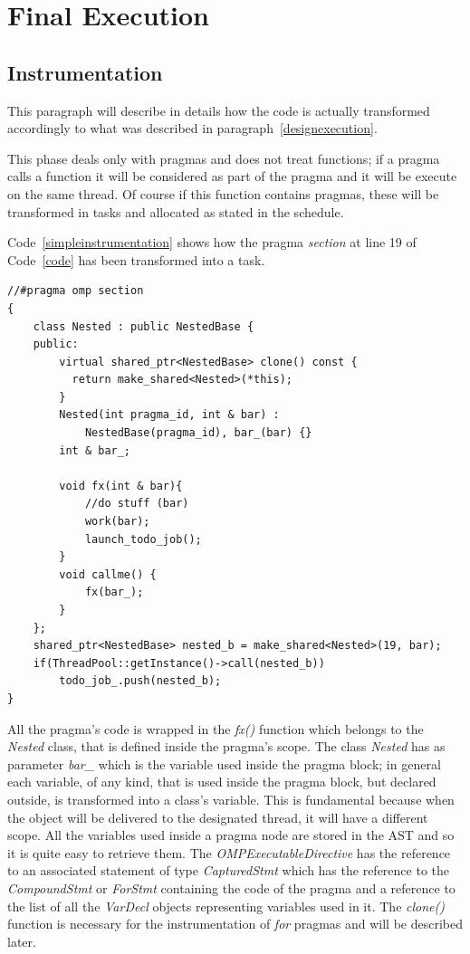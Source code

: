 \documentclass[a4paper,11pt,oneside]{book}
\begin{document}
\section{Final Execution}
\subsection{Instrumentation}
This paragraph will describe in details how the code is actually transformed accordingly to what was described in paragraph~\ref{designexecution}.

This phase deals only with pragmas and does not treat functions; if a pragma calls a function it will be considered as part of the pragma and it will be execute on the same thread. Of course if this function contains pragmas, these will be transformed in tasks and allocated as stated in the schedule.

Code~\ref{simpleinstrumentation} shows how the pragma \emph{section} at line 19 of Code~\ref{code} has been transformed into a task.

\begin{lstlisting}[language=CCC, caption=Example of an instrumented \emph{section} pragma from Code~\ref{code}., label=simpleinstrumentation]
 //#pragma omp section
{
    class Nested : public NestedBase {
    public: 
        virtual shared_ptr<NestedBase> clone() const { 
          return make_shared<Nested>(*this); 
        } 
        Nested(int pragma_id, int & bar) : 
            NestedBase(pragma_id), bar_(bar) {}
        int & bar_;
            
        void fx(int & bar){   
            //do stuff (bar)
            work(bar);
            launch_todo_job(); 
        }
        void callme() {
            fx(bar_);
        }
    };
    shared_ptr<NestedBase> nested_b = make_shared<Nested>(19, bar);                             
    if(ThreadPool::getInstance()->call(nested_b)) 
        todo_job_.push(nested_b); 
}
\end{lstlisting}

All the pragma’s code is wrapped in the \emph{fx()} function which belongs to the \emph{Nested} class, that is defined inside the pragma’s scope. The class \emph{Nested} has as parameter \emph{bar\_} which is the variable used inside the pragma block; in general each variable, of any kind, that is used inside the pragma block, but declared outside, is transformed into a class's variable. This is fundamental because when the object will be delivered to the designated thread, it will have a different scope. All the variables used inside a pragma node are stored in the AST and so it is quite easy to retrieve them. The \emph{OMPExecutableDirective} has the reference to an associated statement of type \emph{CapturedStmt} which has the reference to the \emph{CompoundStmt} or \emph{ForStmt} containing the code of the pragma and a reference to the list of all the \emph{VarDecl} objects representing variables used in it. The \emph{clone()} function is necessary for the instrumentation of \emph{for} pragmas and will be described later.
\end{document}
